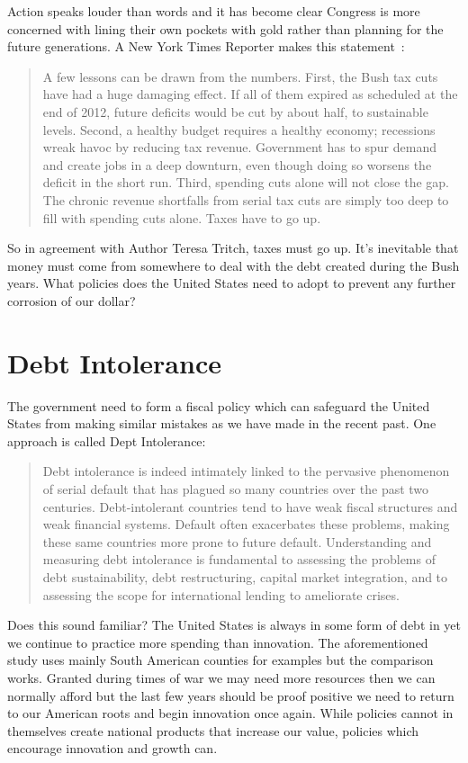 \documentclass[pdflatex,12pt,a4paper]{report}
\begin{document}
\begin{doublespace}
Action speaks louder than words and it has become clear Congress is more concerned with lining their own pockets with gold rather than planning for the future generations. A New York Times Reporter makes this statement~\cite{tritch_how_2011}:  
\end{doublespace}
\begin{quotation}
A few lessons can be drawn from the numbers. First, the Bush tax cuts have had a huge damaging effect. If all of them expired as scheduled at the end of 2012, future deficits would be cut by about half, to sustainable levels. Second, a healthy budget requires a healthy economy; recessions wreak havoc by reducing tax revenue. Government has to spur demand and create jobs in a deep downturn, even though doing so worsens the deficit in the short run. Third, spending cuts alone will not close the gap. The chronic revenue shortfalls from serial tax cuts are simply too deep to fill with spending cuts alone. Taxes have to go up. 
\end{quotation}
\begin{doublespace}
So in agreement with Author Teresa Tritch, taxes must go up. It's inevitable that money must come from somewhere to deal with the debt created during the Bush years. What policies does the United States need to adopt to prevent any further corrosion of our dollar?
\end{doublespace}
\section{Debt Intolerance}
\begin{doublespace}
The government need to form a fiscal policy which can safeguard the United States from making similar mistakes as we have made in the recent past. One approach is called Dept Intolerance: ~\cite{reinhart2003debt}
\end{doublespace}
\begin{quotation}
Debt intolerance is indeed intimately linked to the pervasive phenomenon of
serial default that has plagued so many countries over the past two centuries. Debt-intolerant
countries tend to have weak fiscal structures and weak financial systems. Default often
exacerbates these problems, making these same countries more prone to future default.
Understanding and measuring debt intolerance is fundamental to assessing the problems of debt
sustainability, debt restructuring, capital market integration, and to assessing the scope for
international lending to ameliorate crises.
\end{quotation}
\begin{doublespace}
Does this sound familiar? The United States is always in some form of debt in yet we continue to practice more spending than innovation. The aforementioned study uses mainly South American counties for examples but the comparison works. Granted during times of war we may need more resources then we can normally afford but the last few years should be proof positive we need to return to our American roots and begin innovation once again. While policies cannot in themselves create national products that increase our value, policies which encourage innovation and growth can. 
\end{doublespace}
\end{document}
